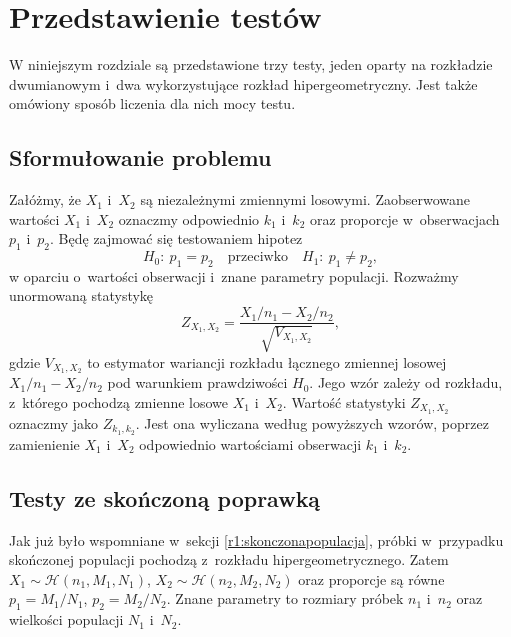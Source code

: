 \chapter{Przedstawienie testów}
\label{rozdzial2}
W niniejszym rozdziale są przedstawione trzy testy, jeden oparty na rozkładzie dwumianowym i~dwa wykorzystujące rozkład hipergeometryczny. Jest także omówiony sposób liczenia dla nich mocy testu.

\section{Sformułowanie problemu}
Załóżmy, że $X_1$ i~$X_2$ są niezależnymi zmiennymi losowymi. Zaobserwowane wartości $X_1$ i~$X_2$ oznaczmy odpowiednio $k_1$ i~$k_2$ oraz proporcje w~obserwacjach $p_1$ i~$p_2$. Będę zajmować się testowaniem hipotez
\begin{equation}
H_0{:}\ p_1=p_2\quad \text{przeciwko} \quad H_1{:}\ p_1\neq p_2,
\end{equation}
w oparciu o~wartości obserwacji i~znane parametry populacji.
Rozważmy unormowaną statystykę
\begin{equation}
Z_{X_1,X_2} = \frac{X_1/n_1-X_2/n_2}{\sqrt{V_{X_1,X_2}}},
\end{equation}
gdzie $V_{X_1,X_2}$ to estymator wariancji rozkładu łącznego zmiennej losowej $X_1/n_1-X_2/n_2$ pod warunkiem prawdziwości $H_0$. Jego wzór zależy od rozkładu, z~którego pochodzą zmienne losowe $X_1$ i~$X_2$.
Wartość statystyki $Z_{X_1,X_2}$ oznaczmy jako $Z_{k_1,k_2}$. Jest ona wyliczana według powyższych wzorów, poprzez zamienienie $X_1$ i~$X_2$ odpowiednio wartościami obserwacji $k_1$ i~$k_2$.

\section{Testy ze skończoną poprawką}
\label{r2:skonczonapoprawka}
Jak już było wspomniane w~sekcji \ref{r1:skonczonapopulacja}, próbki w~przypadku skończonej populacji pochodzą z~rozkładu hipergeometrycznego. Zatem $X_1\sim \mathcal{H}(n_1,M_1,N_1)$, $X_2\sim \mathcal{H}(n_2,M_2,N_2)$ oraz proporcje są równe $p_1=M_1/N_1$, $p_2=M_2/N_2$. Znane parametry to rozmiary próbek $n_1$ i~$n_2$ oraz wielkości populacji $N_1$ i~$N_2$.

